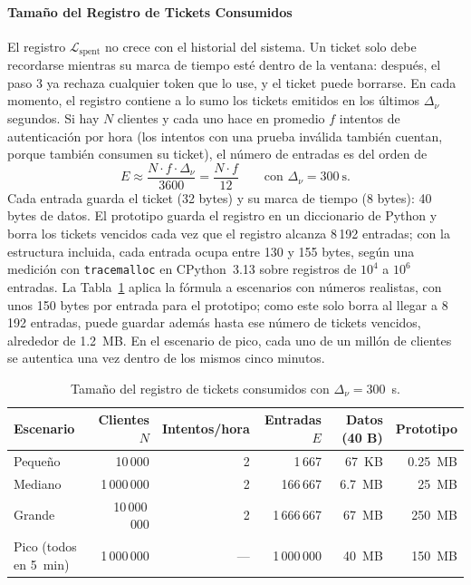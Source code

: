 \paragraph{Tamaño del Registro de Tickets Consumidos}
\label{sec:pqlite-registro}
El registro $\mathcal{L}_{\text{spent}}$ no crece con el historial del sistema. Un ticket solo debe recordarse mientras su marca de tiempo esté dentro de la ventana: después, el paso 3 ya rechaza cualquier token que lo use, y el ticket puede borrarse. En cada momento, el registro contiene a lo sumo los tickets emitidos en los últimos $\Delta_\nu$ segundos. Si hay $N$ clientes y cada uno hace en promedio $f$ intentos de autenticación por hora (los intentos con una prueba inválida también cuentan, porque también consumen su ticket), el número de entradas es del orden de
\begin{equation}
E \approx \frac{N \cdot f \cdot \Delta_\nu}{3600} = \frac{N \cdot f}{12} \qquad \text{con } \Delta_\nu = 300~\text{s}.
\end{equation}
Cada entrada guarda el ticket (32 bytes) y su marca de tiempo (8 bytes): 40 bytes de datos. El prototipo guarda el registro en un diccionario de Python y borra los tickets vencidos cada vez que el registro alcanza 8\,192 entradas; con la estructura incluida, cada entrada ocupa entre 130 y 155 bytes, según una medición con \texttt{tracemalloc} en CPython~3.13 sobre registros de $10^4$ a $10^6$ entradas. La Tabla~\ref{tab:pqlite_registro} aplica la fórmula a escenarios con números realistas, con unos 150 bytes por entrada para el prototipo; como este solo borra al llegar a 8\,192 entradas, puede guardar además hasta ese número de tickets vencidos, alrededor de 1.2~MB. En el escenario de pico, cada uno de un millón de clientes se autentica una vez dentro de los mismos cinco minutos.

\begin{table}[H]
\centering
\caption{Tamaño del registro de tickets consumidos con $\Delta_\nu = 300$~s.}
\label{tab:pqlite_registro}
\small
\setlength{\tabcolsep}{4pt}
\begin{tabular}{lrrrrr}
\toprule
\textbf{Escenario} & \textbf{Clientes $N$} & \textbf{Intentos/hora} & \textbf{Entradas $E$} & \textbf{Datos (40 B)} & \textbf{Prototipo} \\
\midrule
Pequeño & 10\,000 & 2 & 1\,667 & 67~KB & 0.25~MB \\
Mediano & 1\,000\,000 & 2 & 166\,667 & 6.7~MB & 25~MB \\
Grande & 10\,000\,000 & 2 & 1\,666\,667 & 67~MB & 250~MB \\
Pico (todos en 5~min) & 1\,000\,000 & --- & 1\,000\,000 & 40~MB & 150~MB \\
\bottomrule
\end{tabular}
\end{table}

